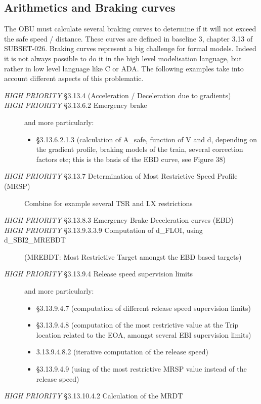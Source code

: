 \documentclass{template/openetcs_report}
\begin{document}
\subsection{Arithmetics and Braking curves}
The OBU must calculate several braking curves to determine if it will not exceed the safe speed / distance. These curves are defined in baseline 3, chapter 3.13 of SUBSET-026. Braking curves represent a big challenge for formal models. Indeed it is not always possible to do it in the high level modelisation language, but rather in low level language like C or ADA. The following examples take into account different aspects of this problematic.
\begin{description}
\item [\emph{HIGH PRIORITY} \S3.13.4 (Acceleration / Deceleration due to gradients)]
\item [\emph{HIGH PRIORITY} \S3.13.6.2 Emergency brake] and more particularly:
  \begin{itemize}
  \item \S3.13.6.2.1.3 (calculation of A\_safe, function of V and d, depending on the gradient profile, braking models of the train,     several correction factors etc; this is the basis of the EBD     curve, see Figure 38)
  \end{itemize}
\item [\emph{HIGH PRIORITY} \S3.13.7 Determination of Most Restrictive Speed Profile (MRSP)] Combine for example several TSR and LX restrictions
\item [\emph{HIGH PRIORITY} \S3.13.8.3 Emergency Brake Deceleration curves (EBD)]
\item [\emph{HIGH PRIORITY} \S3.13.9.3.3.9 Computation of d\_FLOI, using d\_SBI2\_MREBDT] (MREBDT: Most Restrictive Target amongst the EBD based targets)
\item [\emph{HIGH PRIORITY} \S3.13.9.4 Release speed supervision limits] and more particularly:
  \begin{itemize}
  \item \S3.13.9.4.7 (computation of different release speed
    supervision limits)
  \item \S3.13.9.4.8 (computation of the most restrictive value at the Trip location related to the EOA, amongst several EBI supervision limits)
   \item 3.13.9.4.8.2 (iterative computation of the release speed)
   \item \S3.13.9.4.9 (using of the most restrictive MRSP value instead of the release speed)
  \end{itemize}
\item [\emph{HIGH PRIORITY} \S3.13.10.4.2 Calculation of the MRDT]
\end{description}
\end{document}
